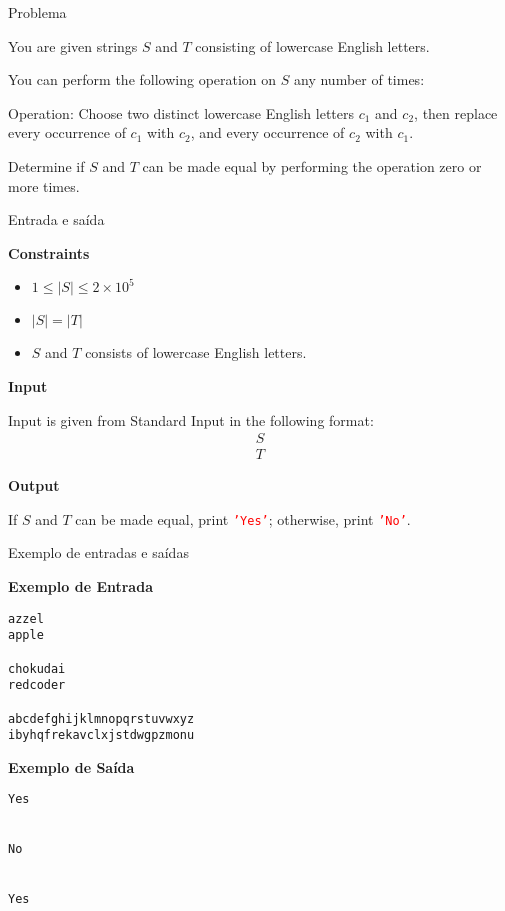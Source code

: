 
\begin{frame}[fragile]{Problema}

You are given strings $S$ and $T$ consisting of lowercase English letters.

You can perform the following operation on $S$ any number of times:

Operation: Choose two distinct lowercase English letters $c_1$ and $c_2$, then replace every 
occurrence of $c_1$ with $c_2$, and every occurrence of $c_2$ with $c_1$.

Determine if $S$ and $T$
 can be made equal by performing the operation zero or more times.
\end{frame}

\begin{frame}[fragile]{Entrada e saída}

\textbf{Constraints}

\begin{itemize}
    \item $1\leq |S| \leq 2\times 10^5$
    \item $|S| = |T|$
    \item $S$ and $T$ consists of lowercase English letters.
\end{itemize}

\textbf{Input}

Input is given from Standard Input in the following format:
\begin{align*}
S \\
T
\end{align*}

\textbf{Output}

If $S$ and $T$ can be made equal, print \texttt{\textcolor{red}{'Yes'}}; otherwise, print 
\texttt{\textcolor{red}{'No'}}.

\end{frame}

\begin{frame}[fragile]{Exemplo de entradas e saídas}

\begin{minipage}[t]{0.5\textwidth}
\textbf{Exemplo de Entrada}
\begin{verbatim}
azzel
apple

chokudai
redcoder

abcdefghijklmnopqrstuvwxyz
ibyhqfrekavclxjstdwgpzmonu
\end{verbatim}
\end{minipage}
\begin{minipage}[t]{0.45\textwidth}
\textbf{Exemplo de Saída}
\begin{verbatim}
Yes


No


Yes
\end{verbatim}
\end{minipage}
\end{frame}

